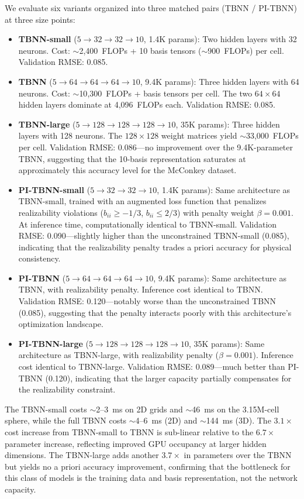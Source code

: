 We evaluate six variants organized into three matched pairs (TBNN / PI-TBNN) at three size points:

\begin{itemize}
    \item \textbf{TBNN-small} ($5 \to 32 \to 32 \to 10$, 1.4K params): Two hidden layers with 32 neurons. Cost: $\sim$2{,}400~FLOPs + 10 basis tensors ($\sim$900~FLOPs) per cell. Validation RMSE: 0.085.
    \item \textbf{TBNN} ($5 \to 64 \to 64 \to 64 \to 10$, 9.4K params): Three hidden layers with 64 neurons. Cost: $\sim$10{,}300~FLOPs + basis tensors per cell. The two $64 \times 64$ hidden layers dominate at 4{,}096~FLOPs each. Validation RMSE: 0.085.
    \item \textbf{TBNN-large} ($5 \to 128 \to 128 \to 128 \to 10$, 35K params): Three hidden layers with 128 neurons. The $128 \times 128$ weight matrices yield $\sim$33{,}000~FLOPs per cell. Validation RMSE: 0.086---no improvement over the 9.4K-parameter TBNN, suggesting that the 10-basis representation saturates at approximately this accuracy level for the McConkey dataset.
    \item \textbf{PI-TBNN-small} ($5 \to 32 \to 32 \to 10$, 1.4K params): Same architecture as TBNN-small, trained with an augmented loss function that penalizes realizability violations ($b_{ii} \geq -1/3$, $b_{ii} \leq 2/3$) with penalty weight $\beta = 0.001$. At inference time, computationally identical to TBNN-small. Validation RMSE: 0.090---slightly higher than the unconstrained TBNN-small (0.085), indicating that the realizability penalty trades a priori accuracy for physical consistency.
    \item \textbf{PI-TBNN} ($5 \to 64 \to 64 \to 64 \to 10$, 9.4K params): Same architecture as TBNN, with realizability penalty. Inference cost identical to TBNN. Validation RMSE: 0.120---notably worse than the unconstrained TBNN (0.085), suggesting that the penalty interacts poorly with this architecture's optimization landscape.
    \item \textbf{PI-TBNN-large} ($5 \to 128 \to 128 \to 128 \to 10$, 35K params): Same architecture as TBNN-large, with realizability penalty ($\beta = 0.001$). Inference cost identical to TBNN-large. Validation RMSE: 0.089---much better than PI-TBNN (0.120), indicating that the larger capacity partially compensates for the realizability constraint.
\end{itemize}

The TBNN-small costs $\sim$2--3~ms on 2D grids and $\sim$46~ms on the 3.15M-cell sphere, while the full TBNN costs $\sim$4--6~ms (2D) and $\sim$144~ms (3D).
The $3.1\times$ cost increase from TBNN-small to TBNN is sub-linear relative to the $6.7\times$ parameter increase, reflecting improved GPU occupancy at larger hidden dimensions.
The TBNN-large adds another $3.7\times$ in parameters over the TBNN but yields no a priori accuracy improvement, confirming that the bottleneck for this class of models is the training data and basis representation, not the network capacity.

